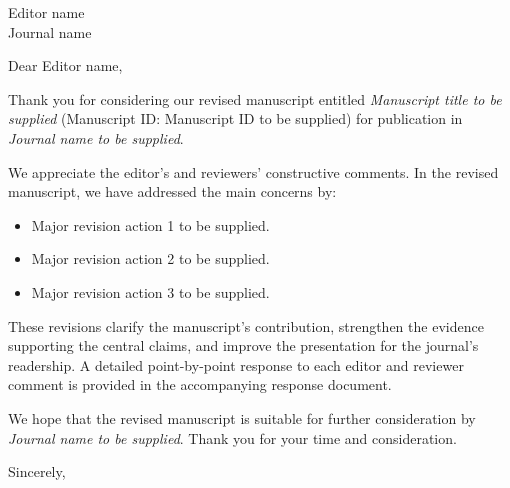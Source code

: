 \documentclass[11pt]{letter}
\date{\today}
\begin{document}
\begin{letter}{Editor name\\Journal name}

\opening{Dear Editor name,}

Thank you for considering our revised manuscript entitled
\emph{Manuscript title to be supplied}
(Manuscript ID: Manuscript ID to be supplied) for publication in
\emph{Journal name to be supplied}.

We appreciate the editor's and reviewers' constructive comments. In the revised
manuscript, we have addressed the main concerns by:
\begin{itemize}
  \item Major revision action 1 to be supplied.
  \item Major revision action 2 to be supplied.
  \item Major revision action 3 to be supplied.
\end{itemize}

These revisions clarify the manuscript's contribution, strengthen the evidence
supporting the central claims, and improve the presentation for the journal's
readership. A detailed point-by-point response to each editor and reviewer
comment is provided in the accompanying response document.

We hope that the revised manuscript is suitable for further consideration by
\emph{Journal name to be supplied}. Thank you for your time and consideration.

\closing{Sincerely,}

\end{letter}
\end{document}
